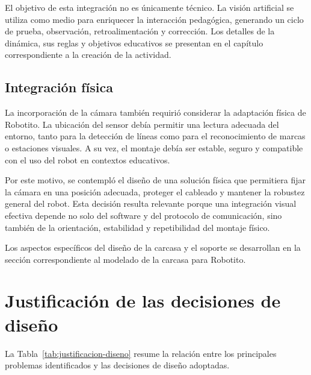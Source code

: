 \documentclass{prgrado}
\begin{document}
El objetivo de esta integración no es únicamente técnico. La visión artificial se utiliza como medio para enriquecer la interacción pedagógica, generando un ciclo de prueba, observación, retroalimentación y corrección. Los detalles de la dinámica, sus reglas y objetivos educativos se presentan en el capítulo correspondiente a la creación de la actividad.

\subsection{Integración física}

La incorporación de la cámara también requirió considerar la adaptación física de Robotito. La ubicación del sensor debía permitir una lectura adecuada del entorno, tanto para la detección de líneas como para el reconocimiento de marcas o estaciones visuales. A su vez, el montaje debía ser estable, seguro y compatible con el uso del robot en contextos educativos.

Por este motivo, se contempló el diseño de una solución física que permitiera fijar la cámara en una posición adecuada, proteger el cableado y mantener la robustez general del robot. Esta decisión resulta relevante porque una integración visual efectiva depende no solo del software y del protocolo de comunicación, sino también de la orientación, estabilidad y repetibilidad del montaje físico.

Los aspectos específicos del diseño de la carcasa y el soporte se desarrollan en la sección correspondiente al modelado de la carcasa para Robotito.

\section{Justificación de las decisiones de diseño}

La Tabla~\ref{tab:justificacion-diseno} resume la relación entre los principales problemas identificados y las decisiones de diseño adoptadas.
\end{document}
